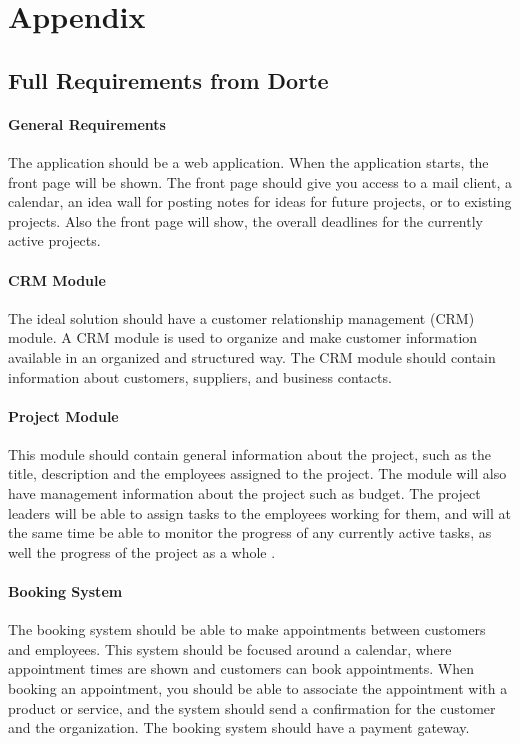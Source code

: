 \newpage
\section{Appendix}

\subsection{Full Requirements from Dorte}

\paragraph{General Requirements}
The application should be a web application. When the application starts, the front page will be shown. The front page should give you access to a mail client, a calendar, an idea wall for posting notes for ideas for future projects, or to existing projects. Also the front page will show, the overall deadlines for the currently active projects. 

\paragraph{CRM Module}
The ideal solution should have a customer relationship management (CRM) module. A CRM module is used to organize and make customer information available in an organized and structured way. The CRM module should contain information about customers, suppliers, and business contacts.

\paragraph{Project Module}
This module should contain general information about the project, such as the title, description and the employees assigned to the project. The module will also have management information about the project such as budget. The project leaders will be able to assign tasks to the employees working for them, and will at the same time be able to monitor the progress of any currently active tasks, as well the progress of the project as a whole .

\paragraph{Booking System}
The booking system should be able to make appointments between customers and employees. This system should be focused around a calendar, where appointment times are shown and customers can book appointments. When booking an appointment, you should be able to associate the appointment with a product or service, and the system should send a confirmation for the customer and the organization. The booking system should have a payment gateway. 

